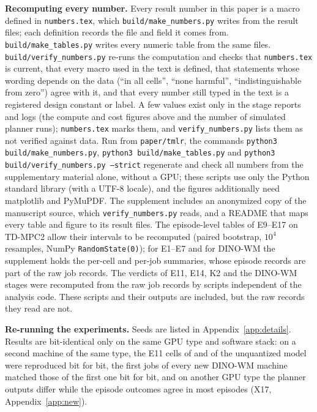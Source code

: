 \textbf{Recomputing every number.} Every result number in this paper is a macro defined in \texttt{numbers.tex}, which \texttt{build/make\_numbers.py} writes from the result files; each definition records the file and field it comes from. \texttt{build/make\_tables.py} writes every numeric table from the same files. \texttt{build/verify\_numbers.py} re-runs the computation and checks that \texttt{numbers.tex} is current, that every macro used in the text is defined, that statements whose wording depends on the data (``in all cells'', ``none harmful'', ``indistinguishable from zero'') agree with it, and that every number still typed in the text is a registered design constant or label. A few values exist only in the stage reports and logs (the compute and cost figures above and the number of simulated planner runs); \texttt{numbers.tex} marks them, and \texttt{verify\_numbers.py} lists them as not verified against data. Run from \texttt{paper/tmlr}, the commands \texttt{python3 build/make\_numbers.py}, \texttt{python3 build/make\_tables.py} and \texttt{python3 build/verify\_numbers.py --strict} regenerate and check all numbers from the supplementary material alone, without a GPU; these scripts use only the Python standard library (with a UTF-8 locale), and the figures additionally need matplotlib and PyMuPDF. The supplement includes an anonymized copy of the manuscript source, which \texttt{verify\_numbers.py} reads, and a README that maps every table and figure to its result files. The episode-level tables of E9--E17 on TD-MPC2 allow their intervals to be recomputed (paired bootstrap, $10^4$ resamples, NumPy \texttt{RandomState(0)}); for E1--E7 and for DINO-WM the supplement holds the per-cell and per-job summaries, whose episode records are part of the raw job records. The verdicts of E11, E14, K2 and the DINO-WM stages were recomputed from the raw job records by scripts independent of the analysis code. These scripts and their outputs are included, but the raw records they read are not.

\textbf{Re-running the experiments.} Seeds are listed in Appendix~\ref{app:details}. Results are bit-identical only on the same GPU type and software stack: on a second machine of the same type, the E11 cells of \detnoise and of the unquantized model were reproduced bit for bit, the first jobs of every new DINO-WM machine matched those of the first one bit for bit, and on another GPU type the planner outputs differ while the episode outcomes agree in most episodes (X17, Appendix~\ref{app:new}).
